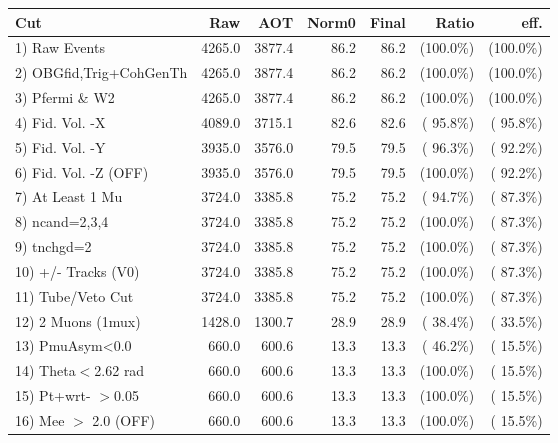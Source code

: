  \begin{table}[h!]\centering
 \begin{tabular}{||l||r|r|r|r|r|r||}
 \hline
 \hline
 Cut & Raw & AOT & Norm0 & Final & Ratio & eff.       \\
 \hline
  1) Raw Events           &       4265.0 &       3877.4 &         86.2 &         86.2 & (100.0\%) & (100.0\%) \\
  2) OBGfid,Trig+CohGenTh &       4265.0 &       3877.4 &         86.2 &         86.2 & (100.0\%) & (100.0\%) \\
  3) Pfermi \& W2         &       4265.0 &       3877.4 &         86.2 &         86.2 & (100.0\%) & (100.0\%) \\
  4) Fid. Vol. -X         &       4089.0 &       3715.1 &         82.6 &         82.6 & ( 95.8\%) & ( 95.8\%) \\
  5) Fid. Vol. -Y         &       3935.0 &       3576.0 &         79.5 &         79.5 & ( 96.3\%) & ( 92.2\%) \\
  6) Fid. Vol. -Z (OFF)   &       3935.0 &       3576.0 &         79.5 &         79.5 & (100.0\%) & ( 92.2\%) \\
  7) At Least 1 Mu        &       3724.0 &       3385.8 &         75.2 &         75.2 & ( 94.7\%) & ( 87.3\%) \\
  8) ncand=2,3,4          &       3724.0 &       3385.8 &         75.2 &         75.2 & (100.0\%) & ( 87.3\%) \\
  9) tnchgd=2             &       3724.0 &       3385.8 &         75.2 &         75.2 & (100.0\%) & ( 87.3\%) \\
 10) +/- Tracks (V0)      &       3724.0 &       3385.8 &         75.2 &         75.2 & (100.0\%) & ( 87.3\%) \\
 11) Tube/Veto Cut        &       3724.0 &       3385.8 &         75.2 &         75.2 & (100.0\%) & ( 87.3\%) \\
 12) 2 Muons (1mux)       &       1428.0 &       1300.7 &         28.9 &         28.9 & ( 38.4\%) & ( 33.5\%) \\
 13) PmuAsym<0.0          &        660.0 &        600.6 &         13.3 &         13.3 & ( 46.2\%) & ( 15.5\%) \\
 14) Theta$<$2.62 rad     &        660.0 &        600.6 &         13.3 &         13.3 & (100.0\%) & ( 15.5\%) \\
 15) Pt+wrt- $>$0.05      &        660.0 &        600.6 &         13.3 &         13.3 & (100.0\%) & ( 15.5\%) \\
 16) Mee $>$ 2.0  (OFF)   &        660.0 &        600.6 &         13.3 &         13.3 & (100.0\%) & ( 15.5\%) \\

\end{tabular}
\end{table}
